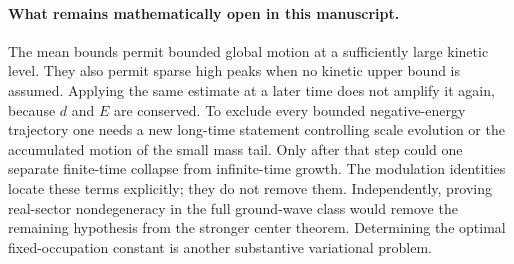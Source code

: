 \documentclass[11pt,a4paper]{article}
\theoremstyle{remark}\newtheorem{remark}[theorem]{Remark}
\begin{document}
\paragraph{What remains mathematically open in this manuscript.}
The mean bounds permit bounded global motion at a sufficiently large
kinetic level. They also permit sparse high peaks when no kinetic
upper bound is assumed. Applying the same estimate at a later time
does not amplify it again, because $d$ and $E$ are conserved.
To exclude every bounded negative-energy trajectory one needs a new
long-time statement controlling scale evolution or the accumulated
motion of the small mass tail. Only after that step could one
separate finite-time collapse from infinite-time growth. The
modulation identities locate these terms explicitly; they do not
remove them. Independently, proving real-sector nondegeneracy in
the full ground-wave class would remove the remaining hypothesis
from the stronger center theorem. Determining the optimal
fixed-occupation constant is another substantive variational problem.

\appendix



\end{document}
